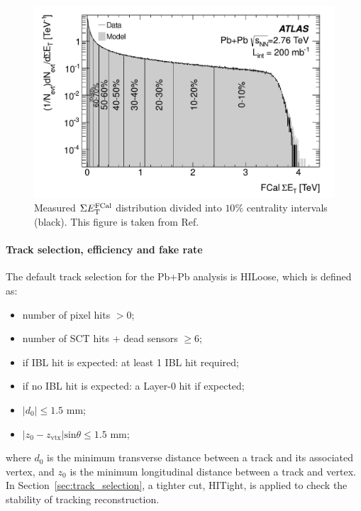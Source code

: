 \begin{figure}[H]
\centering
\includegraphics[width=.6\linewidth]{figs/chapter_detector/ATLAS_centrality_PbPb276.pdf}
\caption{Measured $\Sigma E_\text{T}^\text{FCal}$ distribution divided into $10\%$ centrality intervals (black). This figure is taken from Ref.~\cite{ATLAS:2011ah}}
\label{fig:detector_ATLAS_centrality_PbPb276}
\end{figure}



\paragraph{Track selection, efficiency and fake rate}
\label{sec:track_selection_efficiency_and_fake_rate}

The default track selection for the Pb+Pb analysis is HILoose, which is defined as:
\begin{itemize}
\item number of pixel hits $> 0$;
\item number of SCT hits + dead sensors $\geq 6$;
\item if IBL hit is expected: at least 1 IBL hit required;
\item if no IBL hit is expected: a Layer-0 hit if expected;
\item $|d_0| \leq 1.5$ mm;
\item $|z_0 - z_\text{vtx}|\text{sin}\theta \leq 1.5$ mm;
\end{itemize}
where $d_0$ is the minimum transverse distance between a track and its associated vertex, and $z_0$ is the minimum longitudinal distance between a track and vertex. In Section~\ref{sec:track_selection}, a tighter cut, HITight, is applied to check the stability of tracking reconstruction.

